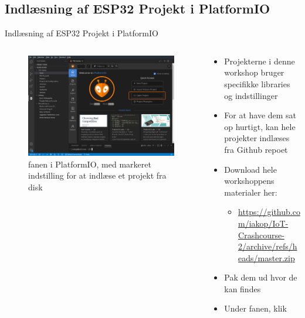 \documentclass[aspectratio=169]{beamer}
\begin{document}
\subsection{Indlæsning af ESP32 Projekt i PlatformIO}
\begin{frame}{Indlæsning af ESP32 Projekt i PlatformIO}
\begin{columns}
	\begin{column}{0.5\textwidth}
		\begin{figure}
  			\includegraphics[width=\textwidth,keepaspectratio=true]{assets/pictures/pio-import.png}
  			\caption{ fanen i PlatformIO, med markeret indstilling for at indlæse et projekt fra disk}
  			\label{fig:pio-project4}
		\end{figure}
	\end{column}
	\begin{column}{0.5\textwidth}
		\begin{textBox}
			\begin{itemize}
				\item Projekterne i denne workshop bruger specifikke libraries og indstillinger
				\item For at have dem sat op hurtigt, kan hele projekter indlæses fra Github repoet
				\item Download hele workshoppens materialer her:
				\begin{itemize}
					\item \small\url{https://github.com/iakop/IoT-Crashcourse-2/archive/refs/heads/master.zip}
				\end{itemize}
				\item Pak dem ud hvor de kan findes
				\item Under  fanen, klik 
			\end{itemize}
		\end{textBox}
	\end{column}
\end{columns}
\end{frame}
\end{document}
